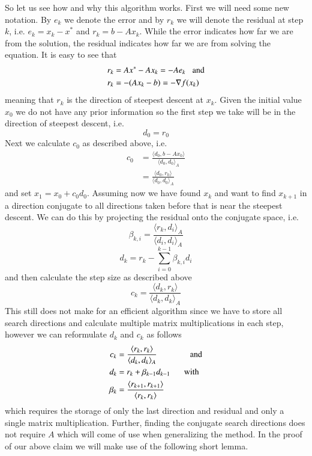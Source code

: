 \documentclass[preprint,12pt,3p]{elsarticle}
\begin{document}
So let us see how and why this algorithm works. First we will need some new notation. By $e_k$ we denote the error and by $r_k$ we will denote the residual at step $k$, i.e. $e_k=x_k-x^*$ and $r_k=b-Ax_k$. While the error indicates how far we are from the solution, the residual indicates how far we are from solving the equation. It is easy to see that 
\begin{align*}
    r_k&=Ax^*-Ax_k=-Ae_k \hspace{0.2cm}\mbox{ and}\\
    r_k&=-(Ax_k-b)=-\nabla f(x_k)
\end{align*}
meaning that $r_k$ is the direction of steepest descent at $x_k$. Given the initial value $x_0$ we do not have any prior information so the first step we take will be in the direction of steepest descent, i.e. 
$$d_0=r_0$$
Next we calculate $c_0$ as described above, i.e.
\begin{align*}
    c_0&=\frac{\langle d_0, b-Ax_0\rangle}{\langle d_0,d_0\rangle_A}\\
    &=\frac{\langle d_0, r_0\rangle}{\langle d_0,d_0\rangle_A}
\end{align*}
and set $x_1=x_0+c_0d_0$. Assuming now we have found $x_k$ and want to find $x_{k+1}$ in a direction conjugate to all directions taken before that is near the steepest descent. We can do this by projecting the residual onto the conjugate space, i.e.
$$\beta_{k,i}=\frac{\langle r_{k},d_i\rangle_{A}}{\langle d_i,d_i\rangle_{A}}$$
$$d_{k}=r_{k}-\sum_{i=0}^{k-1}\beta_{k,i}d_i$$
and then calculate the step size as described above
$$c_{k}=\frac{\langle d_k, r_k\rangle}{\langle d_k,d_k\rangle_A}$$
This still does not make for an efficient algorithm since we have to store all search directions and calculate multiple matrix multiplications in each step, however we can reformulate $d_k$ and $c_k$ as follows
\begin{align*}
    c_k&=\frac{\langle r_k,r_k\rangle}{\langle d_k,d_k\rangle_A}\hspace{1.3 cm}\mbox{ and}\\
    d_{k}&=r_{k}+\beta_{k-1}d_{k-1}\hspace{0.5 cm}\mbox{ with}\\
    \beta_k&=\frac{\langle r_{k+1},r_{k+1}\rangle}{\langle r_k,r_k\rangle}
\end{align*}
which requires the storage of only the last direction and residual and only a single matrix multiplication. Further, finding the conjugate search directions does not require $A$ which will come of use when generalizing the method.
In the proof of our above claim we will make use of the following short lemma.
\end{document}
